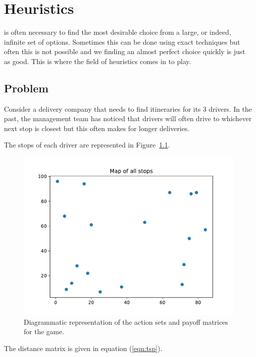 \chapter[Heuristics]{Heuristics}

 is often necessary to find the most desirable choice from
a large, or indeed, infinite set of options. Sometimes this can be done using
exact techniques but often this is not possible and we finding an almost perfect
choice quickly is just as good. This is where the field of heuristics comes in
to play.

\section{Problem}\label{sec:problem}

Consider a delivery company that needs to find itineraries for its 3 drivers. In
the past, the management team has noticed that drivers will often drive to
whichever next stop is closest but this often makes for longer deliveries.

The stops of each driver are represented in Figure~\ref{fig:tsp}.

\begin{figure}
\begin{center}
\includegraphics[width=.8\textwidth]{./assets/tsp/main.pdf}
\end{center}
\caption{Diagrammatic representation of the action sets and payoff matrices for
    the game.}
\label{fig:tsp}
\end{figure}

The distance matrix is given in equation (\ref{eqn:tsp}).

\tiny{
    
}
\normalsize

